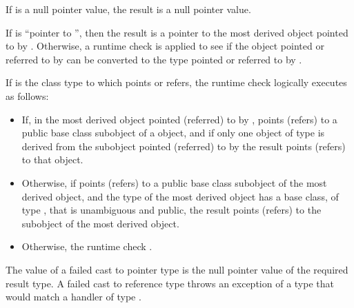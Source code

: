 \pnum
If  is a null pointer value, the result is a null pointer value.

\pnum
If  is ``pointer to \cv{} '', then the result
is a pointer to the most derived object pointed to by .
Otherwise, a runtime check is applied to see if the object pointed or
referred to by  can be converted to the type pointed or
referred to by .

\pnum
If  is the class type to which  points or refers, the runtime
check logically executes as follows:

\begin{itemize}
\item If, in the most derived object pointed (referred) to by ,
 points (refers) to a public base class subobject of a
 object, and if only one object of type  is derived
from the subobject pointed (referred) to by  the result points (refers) to that  object.

\item Otherwise, if  points (refers) to a public base
class subobject of the most derived object, and the type of the most
derived object has a base class, of type , that is unambiguous
and public, the result points (refers) to the
 subobject of the most derived object.

\item Otherwise, the
runtime check .
\end{itemize}

\pnum
The value of a failed cast to pointer type is the null pointer value of
the required result type. A failed cast to reference type throws
an exception of a type that would match a
handler of type .

